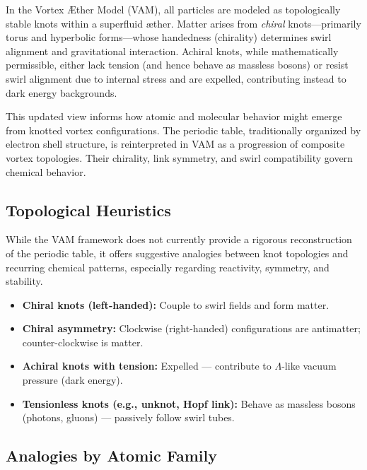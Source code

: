 In the Vortex Æther Model (VAM), all particles are modeled as topologically stable knots within a superfluid æther. Matter arises from \emph{chiral} knots—primarily torus and hyperbolic forms—whose handedness (chirality) determines swirl alignment and gravitational interaction. Achiral knots, while mathematically permissible, either lack tension (and hence behave as massless bosons) or resist swirl alignment due to internal stress and are expelled, contributing instead to dark energy backgrounds.

This updated view informs how atomic and molecular behavior might emerge from knotted vortex configurations. The periodic table, traditionally organized by electron shell structure, is reinterpreted in VAM as a progression of composite vortex topologies. Their chirality, link symmetry, and swirl compatibility govern chemical behavior.

\subsection*{Topological Heuristics}

While the VAM framework does not currently provide a rigorous reconstruction of the periodic table, it offers suggestive analogies between knot topologies and recurring chemical patterns, especially regarding reactivity, symmetry, and stability.

\begin{itemize}
    \item \textbf{Chiral knots (left-handed):} Couple to swirl fields and form matter.
    \item \textbf{Chiral asymmetry:} Clockwise (right-handed) configurations are antimatter; counter-clockwise is matter.
    \item \textbf{Achiral knots with tension:} Expelled — contribute to $\Lambda$-like vacuum pressure (dark energy).
    \item \textbf{Tensionless knots (e.g., unknot, Hopf link):} Behave as massless bosons (photons, gluons) — passively follow swirl tubes.
\end{itemize}

\subsection*{Analogies by Atomic Family}

